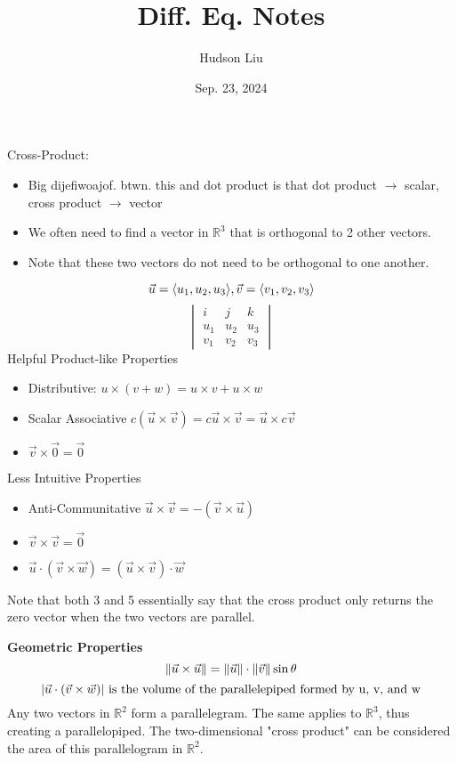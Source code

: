 \documentclass{article}
\title{Diff. Eq. Notes}
\author{Hudson Liu}
\date{Sep. 23, 2024}
\DeclarePairedDelimiter{\opair}{\langle}{\rangle}
\newcommand{\R}{\mathbb{R}}
\begin{document}
\maketitle
Cross-Product:
\begin{itemize}
    \item Big dijefiwoajof. btwn. this and dot product is that dot product $\rightarrow$ scalar, cross product $\rightarrow$ vector
    \item We often need to find a vector in $\R^3$ that is orthogonal to 2 other vectors.
    \item Note that these two vectors do not need to be orthogonal to one another.
\end{itemize}
\[
    \vec{u} = \opair{u_1, u_2, u_3}, \vec{v} = \opair{v_1, v_2, v_3}
\]
\[
\begin{vmatrix}
    i & j & k\\
    u_1 & u_2 & u_3\\
    v_1 & v_2 & v_3
\end{vmatrix}
\]
Helpful Product-like Properties
\begin{itemize}
    \item Distributive: $u \times (v + w) = u \times v + u \times w$
    \item Scalar Associative $c(\vec{u} \times \vec{v})= c\vec{u} \times \vec{v} = \vec{u} \times c\vec{v}$
    \item $\vec{v} \times \vec{0} = \vec{0}$
\end{itemize}

Less Intuitive Properties
\begin{itemize}
    \item Anti-Communitative $\vec{u} \times \vec{v} = -(\vec{v} \times \vec{u})$
    \item $\vec{v} \times \vec{v} = \vec{0}$
    \item $\vec{u} \cdot (\vec{v} \times \vec{w}) = (\vec{u} \times \vec{v}) \cdot \vec{w}$
\end{itemize}
Note that both 3 and 5 essentially say that the cross product only returns the zero vector when the two vectors are parallel.\newline

\textbf{Geometric Properties}
\[
    \norm{\vec{u} \times \vec{u}} = \norm{\vec{u}} \cdot \norm{\vec{v}} \sin{\theta}
\]
\[
    \abs{\vec{u} \cdot (\vec{v} \times \vec{w})} \text{ is the volume of the parallelepiped formed by u, v, and w}
\]
Any two vectors in $\R^2$ form a parallelegram. The same applies to $\R^3$, thus creating a parallelopiped. The two-dimensional "cross product" can be considered the area of this parallelogram in $\R^2$.
\end{document}
